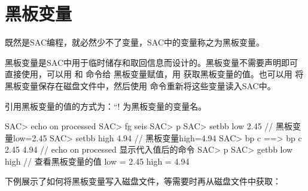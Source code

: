 \section{黑板变量}
既然是SAC编程，就必然少不了变量，SAC中的变量称之为黑板变量。

黑板变量是SAC中用于临时储存和取回信息而设计的。黑板变量不需要声明即可
直接使用，可以用  和  命令给
黑板变量赋值，用  获取黑板变量的值。也可以用
 将黑板变量保存在磁盘文件中，然后使用
 命令重新将这些变量读入SAC中。

引用黑板变量的值的方式为：``!%
为黑板变量的变量名。
\begin{SACCode}
SAC> echo on processed
SAC> fg seis
SAC> p
SAC> setbb low 2.45         // 黑板变量low=2.45
SAC> setbb high 4.94        // 黑板变量high=4.94
SAC> bp c %
 ==>  bp c 2.45 4.94        // echo on processed 显示代入值后的命令
SAC> p
SAC> getbb low high         // 查看黑板变量的值
 low = 2.45
 high = 4.94
\end{SACCode}

下例展示了如何将黑板变量写入磁盘文件，等需要时再从磁盘文件中获取：
